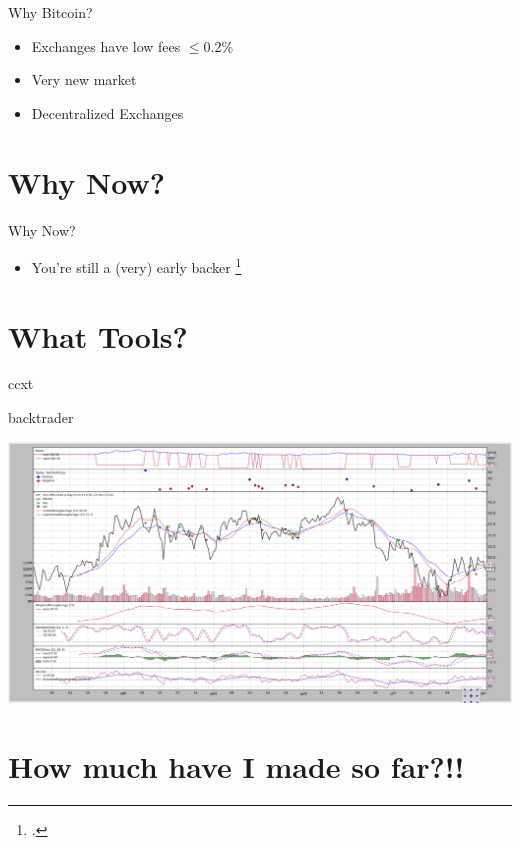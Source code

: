 \documentclass{beamer}
\begin{document}
\begin{frame}{Why Bitcoin?}
  \begin{itemize}
    \item Exchanges have low fees $\leq$0.2\%
    \item Very new market
    \item Decentralized Exchanges
  \end{itemize}
\end{frame}

\section{Why Now?}

\begin{frame}{Why Now?}
  \begin{itemize}
    \item You're still a (very) early backer \footcite{lit1}
  \end{itemize}
\end{frame}

\section{What Tools?}

\begin{frame}{ccxt}
  
\end{frame}

\begin{frame}{backtrader}
    \begin{center}
      \includegraphics[scale=0.21]{images/quickstart}
    \end{center}
\end{frame}

\section{How much have I made so far?!!}
\end{document}
